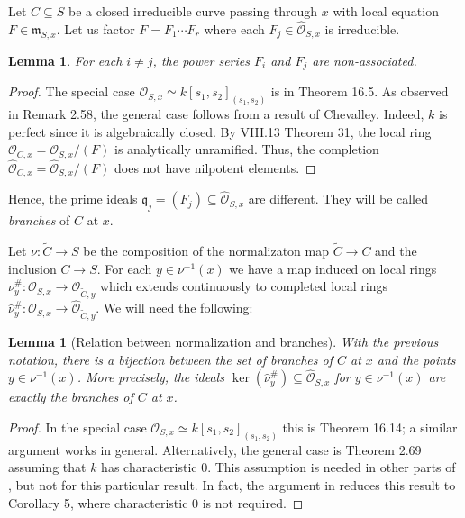 \documentclass[11pt]{amsart}
\newtheorem{lemma}[theorem]{Lemma}
\theoremstyle{remark}
\numberwithin{equation}{section}
\newcommand{\qfrak}{\mathfrak{q}}
\newcommand{\mfrak}{\mathfrak{m}}
\newcommand{\Ocal}{\mathscr{O}}
\begin{document}
 Let $C\subseteq S$ be a closed irreducible curve passing through $x$ with local equation $F\in \mfrak_{S,x}$. Let us factor $F=F_1\cdots F_r$ where each $F_j\in \widehat{\Ocal}_{S,x}$ is irreducible. 
\begin{lemma} For each $i\ne j$, the power series $F_i$ and $F_j$ are non-associated.
\end{lemma} 
\begin{proof} The special case $\Ocal_{S,x}\simeq k[s_1,s_2]_{(s_1,s_2)}$ is in \cite{KunzBranches}  Theorem 16.5.  As observed in \cite{GFthesis} Remark 2.58, the general case follows from a result of Chevalley. Indeed, $k$ is perfect since it is algebraically closed. By \cite{ZariskiSamuel2} VIII.13 Theorem 31, the local ring $\Ocal_{C,x}=\Ocal_{S,x}/(F)$ is analytically unramified. Thus, the completion $\widehat{\Ocal}_{C,x} = \widehat{\Ocal}_{S,x}/(F)$ does not have nilpotent elements.
\end{proof}
Hence, the prime ideals $\qfrak_j=(F_j)\subseteq \widehat{\Ocal}_{S,x}$ are different. They will be called \emph{branches} of $C$ at $x$.

Let $\nu: \widetilde{C}\to S$ be the composition of the normalizaton map $\widetilde{C}\to C$ and the inclusion $C\to S$. For each $y\in \nu^{-1}(x)$ we have a map induced on local rings $\nu^\#_y: \Ocal_{S,x}\to \Ocal_{\widetilde{C},y}$ which extends continuously to completed local rings $\widehat{\nu}^\#_y: \widehat{\Ocal}_{S,x}\to \widehat{\Ocal}_{\widetilde{C},y}$. We will need the following:

\begin{lemma}[Relation between normalization and branches] \label{LemmaBranches} With the previous notation, there is a bijection between the set of branches of $C$ at $x$ and the points $y\in \nu^{-1}(x)$. More precisely, the ideals $\ker(\widehat{\nu}^\#_y)\subseteq \widehat{\Ocal}_{S,x}$ for $y\in \nu^{-1}(x)$ are exactly the branches of $C$ at $x$.
\end{lemma}
\begin{proof} In the special case $\Ocal_{S,x}\simeq k[s_1,s_2]_{(s_1,s_2)}$ this is \cite{KunzBranches} Theorem 16.14; a similar argument works in general. Alternatively, the general case is \cite{GFthesis} Theorem 2.69 assuming that $k$ has characteristic $0$. This assumption is needed in other parts of \cite{GFthesis}, but not  for this particular result. In fact, the argument in \cite{GFthesis} reduces this result to \cite{DKatz} Corollary 5, where characteristic $0$ is not required.
\end{proof}
\end{document}
